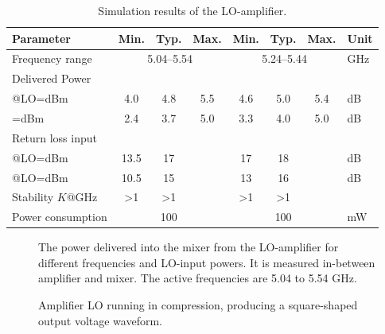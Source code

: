 
			\begin{table}[hbt!]
				\caption[Simulation results of the LO-amplifier.]{Simulation results of the LO-amplifier.\disclaimer}
				\label{tab:resultlo}
				\centering
				\begin{tabular}{ l c c c c c c l } \toprule
					Parameter & Min. & Typ. & Max. & Min. & Typ. & Max. & Unit \\\midrule
					Frequency range & \multicolumn{3}{c}{5.04--5.54} & \multicolumn{3}{c}{5.24--5.44} & GHz \\
					Delivered Power & & & & & & \\
						\qquad @LO=\unit[-2--0]{dBm} 		& 4.0 & 4.8 & 5.5 & 4.6 & 5.0 & 5.4 & dB \\
						\qquad@LO=\unit[-4-- -2]{dBm} 		& 2.4 & 3.7 & 5.0 & 3.3 & 4.0 & 5.0 & dB \\
					Return loss input  & & & & & & \\
						\qquad @LO=\unit[-2--0]{dBm} 	& 13.5 & 17 & & 17 & 18 & & dB \\
						\qquad @LO=\unit[-4-- -2]{dBm} 	& 10.5 & 15 & & 13 & 16 & & dB \\
					Stability $K$@\unit[0--80]{GHz} & >1 & >1 &  & >1 & >1 &  & \\
					Power consumption &  & 100 &  & & 100 & & mW  \\\bottomrule
				\end{tabular}
			\end{table}

			\begin{figure}[hbt!]
				\centering
				\caption[Output power from LO-amplifier]{The power delivered into the mixer from the LO-amplifier for different frequencies and LO-input powers. It is measured in-between amplifier and mixer. The active frequencies are 5.04 to 5.54 GHz.}\label{fig:lo_delivered_power}
			\end{figure}
			\begin{figure}[hbt!]
				\centering
				\caption[Amplifier LO waveform]{Amplifier LO running in compression, producing a square-shaped output voltage waveform.}\label{fig:lo_waveform}
			\end{figure}

